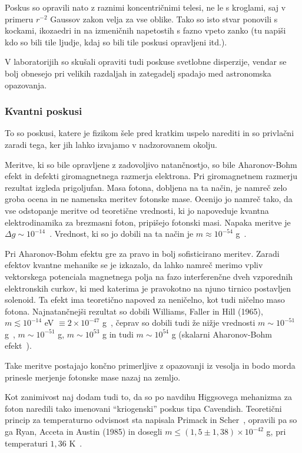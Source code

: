 \documentclass[a4paper, twocolumn, titlepage]{article}
\begin{document}
Poskus so opravili nato z raznimi koncentričnimi telesi, ne le s kroglami, saj v primeru $r^{-2}$ Gaussov zakon velja za vse oblike.
Tako so isto stvar ponovili s kockami, ikozaedri in na izmeničnih napetostih s fazno vpeto zanko (tu napiši kdo so bili tile
ljudje, kdaj so bili tile poskusi opravljeni itd.).

V laboratorijih so skušali opraviti tudi poskuse svetlobne disperzije, vendar se bolj obnesejo pri velikih razdaljah in zategadelj spadajo
med astronomska opazovanja.

\subsubsection{Kvantni poskusi}

To so poskusi, katere je fizikom šele pred kratkim uspelo narediti in so privlačni zaradi tega, ker jih lahko izvajamo v nadzorovanem okolju.

Meritve, ki so bile opravljene z zadovoljivo natančnostjo, so bile Aharonov-Bohm efekt in defekti giromagnetnega razmerja elektrona.
Pri giromagnetnem razmerju rezultat izgleda prigoljufan. Masa fotona, dobljena na ta način, je namreč zelo groba ocena in ne namenska meritev
fotonske mase. Ocenijo jo namreč tako, da vse odstopanje meritve od teoretične vrednosti, ki jo napoveduje kvantna elektrodinamika za
brezmasni foton, pripišejo fotonski masi. Napaka meritve je $\Delta g \sim 10^{-14}$~\cite{over}. Vrednost, ki so jo dobili na ta način je
$m \approx 10^{-54}$ g~\cite{over}.

Pri Aharonov-Bohm efektu gre za pravo in bolj sofisticirano meritev. Zaradi efektov kvantne mehanike se je izkazalo, da lahko namreč merimo
vpliv vektorskega potenciala magnetnega polja na fazo interferenčne dveh vzporednih elektronskih curkov, ki med katerima je pravokotno na njuno
tirnico postavljen solenoid. Ta efekt ima teoretično napoved za
neničelno, kot tudi ničelno maso fotona. Najnatančnejši rezultat so dobili Williams, Faller in Hill (1965),
$m \lesssim 10^{-14}$ eV $\equiv 2\times 10^{-47}$ g~\cite{nieto2}, čeprav so dobili tudi že nižje vrednosti $m \sim 10^{-51}$ g~\cite{over},
$m \sim 10^{-51}$ g, $m \sim 10^{53}$ g in tudi $m \sim 10^{54}$ g (skalarni Aharonov-Bohm efekt~\cite{over}).

Take meritve postajajo končno primerljive z opazovanji iz vesolja in
bodo morda prinesle merjenje fotonske mase nazaj na zemljo.

Kot zanimivost naj dodam tudi to, da so po navdihu Higgsovega mehanizma za foton naredili tako imenovani "`kriogenski"' poskus tipa Cavendish.
Teoretični princip za temperaturno odvisnost sta napisala Primack in Scher~\cite{nieto2},
opravili pa so ga Ryan, Acceta in Austin (1985) in dosegli $m \leq (1,5 \pm 1,38) \times 10^{-42}$ g, pri temperaturi
$1,36$ K~\cite{over}.
\end{document}
